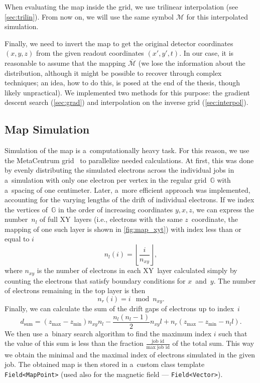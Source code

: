 		When evaluating the map inside the grid, we use trilinear interpolation (see \cref{sec:trilin}). From now on, we will use the same symbol $\mathcal{M}$ for this interpolated simulation.
		
		Finally, we need to invert the map to get the original detector coordinates $(x,y,z)$ from the given readout coordinates $(x',y',t)$. In our case, it is reasonable to assume that the mapping $\overline{\mathcal{M}}$ (we lose the information about the distribution, although it might be possible to recover through complex techniques; an idea, how to do this, is posed at the end of the thesis, though likely unpractical). We implemented two methods for this purpose: the gradient descent search (\cref{sec:grad}) and interpolation on the inverse grid (\cref{sec:interpol}).
		
		\subsection{Map Simulation}
			Simulation of the map is a~computationally heavy task. For this reason, we use the MetaCentrum grid~\cite{metacentrum} to parallelize needed calculations. At first, this was done by evenly distributing the simulated electrons across the individual jobs in a~simulation with only one electron per vertex in the regular grid~$\mathbb{G}$ with a~spacing of one centimeter. Later, a~more efficient approach was implemented, accounting for the varying lengths of the drift of individual electrons. If we index the vertices of~$\mathbb{G}$ in the order of increasing coordinates $y,x,z$, we can express the number~$n_l$ of full XY~layers (i.e., electrons with the same $z$~coordinate, the mapping of one such layer is shown in \cref{fig:map_xyt}) with index less than or equal to $i$
				\begin{equation}
					n_l(i) = \left\lfloor\frac{i}{n_{xy}}\right\rfloor,
				\end{equation}
			where $n_{xy}$ is the number of electrons in each XY~layer calculated simply by counting the electrons that satisfy boundary conditions for $x$~and~$y$. The number of electrons remaining in the top layer is then
				\begin{equation}
					n_r(i) = i\!\!\!\!\mod n_{xy}.
				\end{equation}
			Finally, we can calculate the sum of the drift gaps of electrons up to index~$i$
				\begin{equation}
					d_\text{sum} = (z_\text{max}-z_\text{min})n_{xy}n_l-\frac{n_l(n_l-1)}{2}n_{xy}l+n_r(z_\text{max}-z_\text{min}-n_l l).
				\end{equation}
			We then use a~binary search algorithm to find the maximum index $i$ such that the value of this sum is less than the fraction $\frac{\text{job id}}{\text{max job id}}$ of the total sum. This way we obtain the minimal and the maximal index of electrons simulated in the given job. The obtained map is then stored in a~custom class template \texttt{Field<MapPoint>} (used also for the magnetic field --- \texttt{Field<Vector>}).
		

